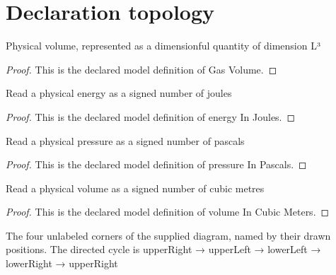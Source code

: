 \section{Declaration topology}
\begin{definition}
  \label{def:physics:phyx-mini-0423:phyxminiproblems-problemphyxmini0423-gasvolume}
  Physical volume, represented as a dimensionful quantity of dimension L³
\end{definition}
\begin{proof}
  This is the declared model definition of Gas Volume.
\end{proof}
\begin{definition}
  \label{def:physics:phyx-mini-0423:phyxminiproblems-problemphyxmini0423-energyinjoules}
  Read a physical energy as a signed number of joules
\end{definition}
\begin{proof}
  This is the declared model definition of energy In Joules.
\end{proof}
\begin{definition}
  \label{def:physics:phyx-mini-0423:phyxminiproblems-problemphyxmini0423-pressureinpascals}
  Read a physical pressure as a signed number of pascals
\end{definition}
\begin{proof}
  This is the declared model definition of pressure In Pascals.
\end{proof}
\begin{definition}
  \label{def:physics:phyx-mini-0423:phyxminiproblems-problemphyxmini0423-volumeincubicmeters}
  Read a physical volume as a signed number of cubic metres
\end{definition}
\begin{proof}
  This is the declared model definition of volume In Cubic Meters.
\end{proof}
\begin{definition}
  \label{def:physics:phyx-mini-0423:phyxminiproblems-problemphyxmini0423-cyclepoint}
  The four unlabeled corners of the supplied diagram, named by their drawn positions. The directed cycle is upperRight → upperLeft → lowerLeft → lowerRight → upperRight
\end{definition}

